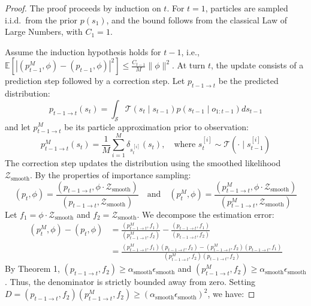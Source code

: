 \documentclass[11pt,a4paper]{report}
\begin{document}
\begin{proof}
The proof proceeds by induction on $t$. For $t = 1$, particles are sampled i.i.d.\ from the prior $p(s_1)$, and the bound follows from the classical Law of Large Numbers, with $C_1 = 1$.

Assume the induction hypothesis holds for $t-1$, i.e., $\mathbb{E}\left[ \left| (p_{t-1}^M, \phi) - (p_{t-1}, \phi) \right|^2 \right] \le \frac{C_{t-1}}{M} \parallel \phi \parallel^2$.
At turn $t$, the update consists of a prediction step followed by a correction step. Let $p_{t-1 \to t}$ be the predicted distribution:
\begin{equation}
    p_{t-1 \to t}(s_t) = \int_{\mathcal{S}} \mathcal{T}(s_t \mid s_{t-1}) p(s_{t-1} \mid o_{1:t-1}) ds_{t-1}
\end{equation}
and let $p_{t-1 \to t}^M$ be its particle approximation prior to observation:
\begin{equation}
    p_{t-1 \to t}^M(s_t) = \frac{1}{M} \sum_{i=1}^M \delta_{s_t^{[i]}}(s_t), \quad \text{where } s_t^{[i]} \sim \mathcal{T}(\cdot \mid s_{t-1}^{[i]})
\end{equation}
The correction step updates the distribution using the smoothed likelihood $\mathcal{Z}_{\text{smooth}}$. By the properties of importance sampling:
\begin{equation}
    (p_t, \phi) = \frac{(p_{t-1 \to t}, \phi \cdot \mathcal{Z}_{\text{smooth}})}{(p_{t-1 \to t}, \mathcal{Z}_{\text{smooth}})} \quad \text{and} \quad (p_t^M, \phi) = \frac{(p_{t-1 \to t}^M, \phi \cdot \mathcal{Z}_{\text{smooth}})}{(p_{t-1 \to t}^M, \mathcal{Z}_{\text{smooth}})}
\end{equation}
Let $f_1 = \phi \cdot \mathcal{Z}_{\text{smooth}}$ and $f_2 = \mathcal{Z}_{\text{smooth}}$. We decompose the estimation error:
\begin{equation}
    \begin{split}
        (p_t^M, \phi) - (p_t, \phi) &= \frac{(p_{t-1 \to t}^M, f_1)}{(p_{t-1 \to t}^M, f_2)} - \frac{(p_{t-1 \to t}, f_1)}{(p_{t-1 \to t}, f_2)} \\
        &= \frac{(p_{t-1 \to t}^M, f_1)(p_{t-1 \to t}, f_2) - (p_{t-1 \to t}^M, f_2)(p_{t-1 \to t}, f_1)}{(p_{t-1 \to t}^M, f_2)(p_{t-1 \to t}, f_2)}
    \end{split}
\end{equation}
By Theorem 1, $(p_{t-1 \to t}, f_2) \ge \alpha_{\text{smooth}} \epsilon_{\text{smooth}}$ and $(p_{t-1 \to t}^M, f_2) \ge \alpha_{\text{smooth}} \epsilon_{\text{smooth}}$. Thus, the denominator is strictly bounded away from zero. Setting $D = (p_{t-1 \to t}, f_2)(p_{t-1 \to t}^M, f_2) \ge (\alpha_{\text{smooth}} \epsilon_{\text{smooth}})^2$, we have:

\end{proof}
\end{document}
